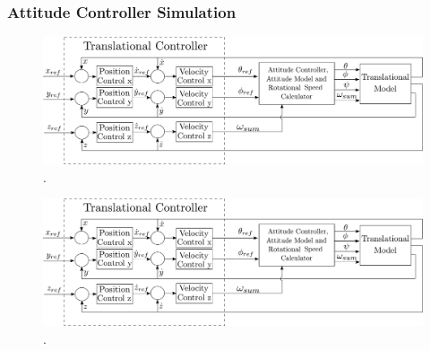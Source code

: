 \subsubsection{Attitude Controller Simulation}

\begin{figure}[H]
	\centering
	\includegraphics[scale=0.25]{figures/TranslationalControlDiagram}
	\caption{.}
	\label{fig:TranslationalControlDiagram}
\end{figure}


\begin{figure}[H]
	\centering
	\includegraphics[scale=0.25]{figures/TranslationalControlDiagram}
	\caption{.}
	\label{fig:TranslationalControlDiagram}
\end{figure}